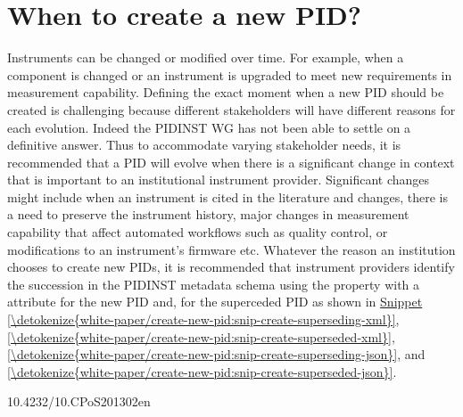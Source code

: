 \documentclass[a4paper,10pt,english]{sphinxmanual}
\begin{document}
\section{When to create a new PID?}
\label{\detokenize{white-paper/create-new-pid:when-to-create-a-new-pid}}\label{\detokenize{white-paper/create-new-pid::doc}}
\sphinxAtStartPar
Instruments can be changed or modified over time. For example, when a
component is changed or an instrument is upgraded to meet new
requirements in measurement capability. Defining the exact moment when a
new PID should be created is challenging because different stakeholders
will have different reasons for each evolution. Indeed the PIDINST WG
has not been able to settle on a definitive answer. Thus to accommodate
varying stakeholder needs, it is recommended that a PID will evolve when
there is a significant change in context that is important to an
institutional instrument provider. Significant changes might include
when an instrument is cited in the literature and changes, there is a
need to preserve the instrument history, major changes in measurement
capability that affect automated workflows such as quality control, or
modifications to an instrument’s firmware etc. Whatever the reason an
institution chooses to create new PIDs, it is recommended that
instrument providers identify the succession in the PIDINST metadata
schema using the  property with a 
attribute  for the new PID and, 
for the superceded PID as shown in
\hyperref[\detokenize{white-paper/create-new-pid:snip-create-superseding-xml}]{Snippet \ref{\detokenize{white-paper/create-new-pid:snip-create-superseding-xml}}},
\hyperref[\detokenize{white-paper/create-new-pid:snip-create-superseded-xml}]{\ref{\detokenize{white-paper/create-new-pid:snip-create-superseded-xml}}},
\hyperref[\detokenize{white-paper/create-new-pid:snip-create-superseding-json}]{\ref{\detokenize{white-paper/create-new-pid:snip-create-superseding-json}}}, and
\hyperref[\detokenize{white-paper/create-new-pid:snip-create-superseded-json}]{\ref{\detokenize{white-paper/create-new-pid:snip-create-superseded-json}}}.
\def\sphinxLiteralBlockLabel{\label{\detokenize{white-paper/create-new-pid:snip-create-superseding-xml}}}
\begin{sphinxVerbatim}[commandchars=\\\{\}]
       10.4232/10.CPoS\PYGZhy{}2013\PYGZhy{}02en
\end{sphinxVerbatim}
\end{document}
